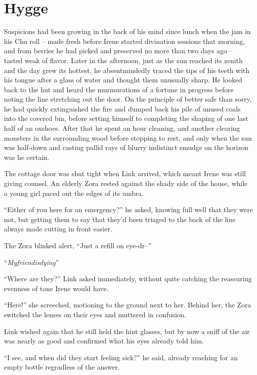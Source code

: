 \documentclass[../FGP.tex]{subfiles}
\begin{document}
\section{Hygge}
\begin{fragment}Suspicions had been growing in the back of his mind since lunch when the jam in his Chu roll -- made fresh before Irene started divination sessions that morning, and from berries he had picked and preserved no more than two days ago -- tasted weak of flavor. Later in the afternoon, just as the sun reached its zenith and the day grew its hottest, he absentmindedly traced the tips of his teeth with his tongue after a glass of water and thought them unusually sharp. He looked back to the hut and heard the murmurations of a fortune in progress before noting the line stretching out the door. On the principle of better safe than sorry, he had quickly extinguished the fire and dumped back his pile of unused coals into the covered bin, before setting himself to completing the shaping of one last half of an oxshoes. After that he spent an hour cleaning, and another clearing monsters in the surrounding wood before stopping to rest, and only when the sun was half-down and casting pallid rays of blurry indistinct smudge on the horizon was he certain.

The cottage door was shut tight when Link arrived, which meant Irene was still giving counsel. An elderly Zora rested against the shady side of the house, while a young girl paced out the edges of its umbra.

``Either of you here for an emergency?'' he asked, knowing full well that they were not, but getting them to say that they'd been triaged to the back of the line always made cutting in front easier.

The Zora blinked alert, ``Just a refill on eye-dr--''  

``\emph{Myfriendisdying}'' 

``Where are they?'' Link asked immediately, without quite catching the reassuring evenness of tone Irene would have.

``Here!'' she screeched, motioning to the ground next to her. Behind her, the Zora switched the lenses on their eyes and muttered in confusion.

Link wished again that he still held the hint glasses, but by now a sniff of the air was nearly as good and confirmed what his eyes already told him.

``I see, and when did they start feeling sick?'' he said, already reaching for an empty bottle regradless of the answer. 


\end{fragment}
\end{document}
